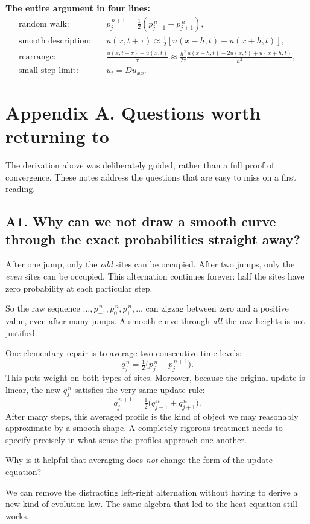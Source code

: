 \documentclass[11pt,a4paper]{article}
\newcommand{\ans}[1]{\par\vspace{4pt}{\small\color{blue}\textbf{Answer.}}\enspace #1}
\begin{document}
\begin{takeaway}
\textbf{The entire argument in four lines:}
\begin{align*}
\text{random walk:}\quad &p_j^{\,n+1}=\tfrac12(p_{j-1}^{\,n}+p_{j+1}^{\,n}),\\[2pt]
\text{smooth description:}\quad &u(x,t+\tau)\approx\tfrac12[u(x-h,t)+u(x+h,t)],\\[2pt]
\text{rearrange:}\quad &\frac{u(x,t+\tau)-u(x,t)}{\tau}\approx\frac{h^2}{2\tau}\frac{u(x-h,t)-2u(x,t)+u(x+h,t)}{h^2},\\[2pt]
\text{small-step limit:}\quad &\boxed{u_t=D u_{xx}.}
\end{align*}
\end{takeaway}

\clearpage
\appendix
\section*{Appendix A. Questions worth returning to}
The derivation above was deliberately guided, rather than a full proof of convergence. These notes address the questions that are easy to miss on a first reading.

\subsection*{A1. Why can we not draw a smooth curve through the exact probabilities straight away?}
After one jump, only the \emph{odd} sites can be occupied. After two jumps, only the \emph{even} sites can be occupied. This alternation continues forever: half the sites have zero probability at each particular step.

So the raw sequence $\ldots,p_{-1}^{\,n},p_0^{\,n},p_1^{\,n},\ldots$ can zigzag between zero and a positive value, even after many jumps. A smooth curve through \emph{all} the raw heights is not justified.

One elementary repair is to average two consecutive time levels:
\[
 q_j^{\,n}=\tfrac12\bigl(p_j^{\,n}+p_j^{\,n+1}\bigr).
\]
This puts weight on both types of sites. Moreover, because the original update is linear, the new $q_j^{\,n}$ satisfies the very same update rule:
\[
 q_j^{\,n+1}=\tfrac12\bigl(q_{j-1}^{\,n}+q_{j+1}^{\,n}\bigr).
\]
After many steps, this averaged profile is the kind of object we may reasonably approximate by a smooth shape. A completely rigorous treatment needs to specify precisely in what sense the profiles approach one another.

\begin{think}
Why is it helpful that averaging does \emph{not} change the form of the update equation?
\ans{We can remove the distracting left-right alternation without having to derive a new kind of evolution law. The same algebra that led to the heat equation still works.}
\end{think}
\end{document}
